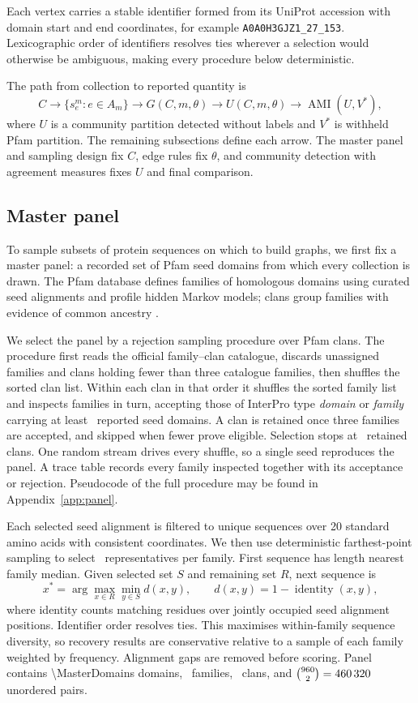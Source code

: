 \documentclass[11pt,a4paper]{article}
\begin{document}
Each vertex carries a stable identifier formed from its UniProt accession with
domain start and end coordinates, for example \texttt{A0A0H3GJZ1\_27\_153}.
Lexicographic order of identifiers resolves ties wherever a selection would
otherwise be ambiguous, making every procedure below deterministic.

The path from collection to reported quantity is
\[
C \longrightarrow \{s_e^m:e\in A_m\}
\longrightarrow G(C,m,\theta)
\longrightarrow U(C,m,\theta)
\longrightarrow \operatorname{AMI}(U,V^*),
\]
where \(U\) is a community partition detected without labels and \(V^*\) is
withheld Pfam partition. The remaining subsections define each arrow. The master panel
and sampling design fix \(C\), edge rules fix \(\theta\), and community
detection with agreement measures fixes \(U\) and final comparison.

\subsection{Master panel}
\label{ssec:panel}

To sample subsets of protein sequences on which to build graphs, we first fix a
master panel: a recorded set of Pfam seed domains from which every collection is
drawn. The Pfam database defines families of homologous domains using curated seed alignments and
profile hidden Markov models; clans group families with evidence of common
ancestry \citep{mistry2021pfam}.

We select the panel by a rejection sampling procedure over Pfam clans. The
procedure first reads the official family--clan catalogue, discards
unassigned families and clans holding fewer than three catalogue families, then
shuffles the sorted clan list. Within each clan in that order it shuffles the sorted
family list and inspects families in turn, accepting those of InterPro type
\emph{domain} or \emph{family} carrying at least \TargetPerFamily\ reported
seed domains. A clan is retained once three families are accepted, and skipped
when fewer prove eligible. Selection stops at \MasterClans\ retained clans. One
random stream drives every shuffle, so a single seed reproduces the panel. A trace
table records every family inspected together with its acceptance or rejection. Pseudocode of the full procedure
may be found in Appendix~\ref{app:panel}.

Each selected seed alignment is filtered to unique sequences over 20 standard
amino acids with consistent coordinates. We then use deterministic farthest-point sampling
to select \TargetPerFamily\ representatives per family. First sequence has
length nearest family median. Given selected set \(S\) and remaining set
\(R\), next sequence is
\[
x^*=\arg\max_{x\in R}\min_{y\in S}d(x,y),\qquad
d(x,y)=1-\operatorname{identity}(x,y),
\]
where identity counts matching residues over jointly occupied seed alignment
positions. Identifier order resolves ties. This maximises within-family
sequence diversity, so recovery results are conservative relative to a
sample of each family weighted by frequency. Alignment gaps are removed before
scoring. Panel contains \num{\MasterDomains} domains, \MasterFamilies\
families, \MasterClans\ clans, and
\(\binom{960}{2}=\num{460320}\) unordered pairs.
\end{document}
